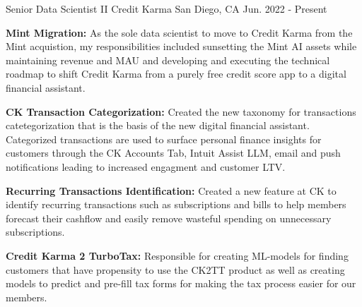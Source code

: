 


\begin{cventries}




\cventry
    {Senior Data Scientist II} %
    {Credit Karma} %
    {San Diego, CA} %
    {Jun. 2022 - Present} %
    {\begin{cvitems}
        \setlength\itemsep{.15em}
        \item { \textbf{Mint Migration: } As the sole data scientist to move to Credit Karma from the Mint acquistion, my responsibilities included sunsetting the Mint AI assets while maintaining revenue and MAU and developing and executing the technical roadmap  to shift Credit Karma from a purely free credit score app to a digital financial assistant.  }
        \item { \textbf{CK Transaction Categorization: } Created the new taxonomy for transactions catetegorization that is the basis of the new digital financial
        assistant. Categorized transactions are used to surface personal finance insights for customers through the CK Accounts Tab, Intuit Assist LLM, email and push notifications leading to increased engagment and customer LTV.}
         \item { \textbf{Recurring Transactions Identification: } Created a new feature at CK to identify recurring transactions such as subscriptions and bills to help members forecast their cashflow and easily remove wasteful spending on unnecessary subscriptions.}
         \item { \textbf{Credit Karma 2 TurboTax:} Responsible for creating ML-models for finding customers that have propensity to use the CK2TT product as well as creating models to predict and pre-fill tax forms for making the tax process easier for our members. }
     \end{cvitems}}



\end{cventries}
